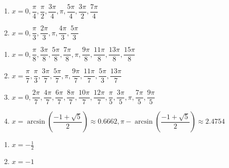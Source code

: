 \begin{multicols}{2}

\begin{enumerate}

\setcounter{enumi}{\value{HW}}

\item  $x = 0, \dfrac{\pi}{4}, \dfrac{\pi}{2}, \dfrac{3\pi}{4}, \pi, \dfrac{5\pi}{4}, \dfrac{3\pi}{2}, \dfrac{7\pi}{4}$
\item $x = 0, \dfrac{\pi}{3}, \dfrac{2\pi}{3}, \pi, \dfrac{4\pi}{3}, \dfrac{5\pi}{3}$

\setcounter{HW}{\value{enumi}}

\end{enumerate}

\end{multicols}

\begin{enumerate}

\setcounter{enumi}{\value{HW}}

\item $x = 0, \dfrac{\pi}{8}, \dfrac{3\pi}{8}, \dfrac{5\pi}{8}, \dfrac{7\pi}{8}, \pi, \dfrac{9\pi}{8}, \dfrac{11\pi}{8}, \dfrac{13\pi}{8}, \dfrac{15\pi}{8}$

\item $x = \dfrac{\pi}{7}, \dfrac{\pi}{3}, \dfrac{3\pi}{7}, \dfrac{5\pi}{7}, \pi, \dfrac{9\pi}{7}, \dfrac{11\pi}{7}, \dfrac{5\pi}{3}, \dfrac{13\pi}{7}$ 

\item $x = 0, \dfrac{2\pi}{7}, \dfrac{4\pi}{7}, \dfrac{6\pi}{7}, \dfrac{8\pi}{7}, \dfrac{10\pi}{7}, \dfrac{12\pi}{7}, \dfrac{\pi}{5}, \dfrac{3\pi}{5}, \pi, \dfrac{7\pi}{5}, \dfrac{9\pi}{5}$ 

\item $x = \arcsin \left( \dfrac{-1 + \sqrt{5}}{2} \right) \approx 0.6662, \pi - \arcsin \left( \dfrac{-1 + \sqrt{5}}{2} \right) \approx 2.4754$

\setcounter{HW}{\value{enumi}}

\end{enumerate}

\begin{multicols}{2}
\begin{enumerate}
\setcounter{enumi}{\value{HW}}

\item $x = -\frac{1}{2}$
\item $x=-1$ 

\setcounter{HW}{\value{enumi}}
\end{enumerate}
\end{multicols}


